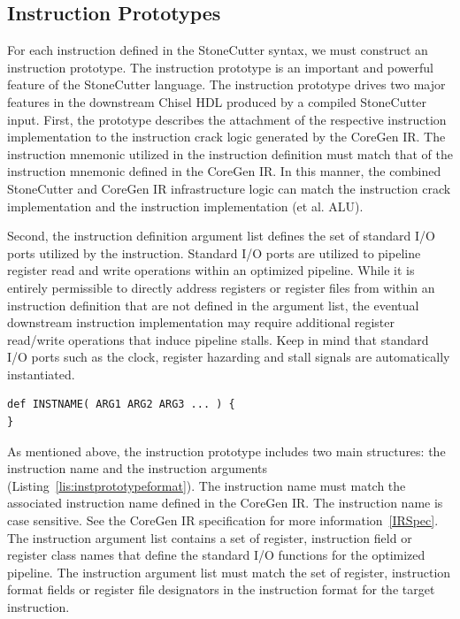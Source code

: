 \documentclass{article}
\begin{document}
\clearpage
\subsection{Instruction Prototypes}
\label{sec:InstructionPrototypes}

For each instruction defined in the StoneCutter syntax, we must construct 
an instruction prototype.  The instruction prototype is an important and powerful 
feature of the StoneCutter language.  The instruction prototype drives two major 
features in the downstream Chisel HDL produced by a compiled StoneCutter input.  
First, the prototype describes the attachment of the respective instruction implementation 
to the instruction crack logic generated by the CoreGen IR.  The instruction mnemonic 
utilized in the instruction definition must match that of the instruction mnemonic defined 
in the CoreGen IR.  In this manner, the combined StoneCutter and CoreGen IR infrastructure 
logic can match the instruction crack implementation and the instruction implementation (et al. ALU).  

Second, the instruction definition argument list defines the set of standard I/O ports utilized by the 
instruction.  Standard I/O ports are utilized to pipeline register read and write operations within an 
optimized pipeline.  While it is entirely permissible to directly address registers or register files 
from within an instruction definition that are not defined in the argument list, the eventual downstream 
instruction implementation may require additional register read/write operations that induce pipeline 
stalls.  Keep in mind that standard I/O ports such as the clock, register hazarding and stall signals 
are automatically instantiated.  

\vspace{0.125in}
\begin{lstlisting}[frame=single,style=base,caption={Instruction Prototype Format},captionpos=b,label={lis:instprototypeformat}]
def INSTNAME( ARG1 ARG2 ARG3 ... ) {
}
\end{lstlisting}

As mentioned above, the instruction prototype includes two main structures: the instruction 
name and the instruction arguments (Listing~\ref{lis:instprototypeformat}).  The instruction name must match the associated instruction 
name defined in the CoreGen IR.  The instruction name is case sensitive.  
See the CoreGen IR specification for more information~\ref{IRSpec}.  The instruction 
argument list contains a set of register, instruction field or register class names that define the standard I/O functions 
for the optimized pipeline.  The instruction argument list must match the set of register, instruction format fields or register file designators 
in the instruction format for the target instruction. 
  
\end{document}
